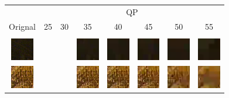 \begin{table}[H]
  \centering
  \begin{tabular}{| c | c | c | c | c | c | c | c |}
    \hline                          & \multicolumn{7}{c|}{QP} \\ \cline{2-8} 
    \multirow{-2}{*}{Orignal} & 25    & 30   & 35   & 40   & 45   & 50   & 55   \\ \hline 
    &&&&&&&\\
    \includegraphics[height=1cm]{figures/11.png}                                                 &      &      & \includegraphics[height=1cm]{figures/12.png}       & \includegraphics[height=1cm]{figures/13.png}       & \includegraphics[height=1cm]{figures/14.png}    & \includegraphics[height=1cm]{figures/15.png}    & \includegraphics[height=1cm]{figures/16.png}    \\ 
    \includegraphics[height=1cm]{figures/21.png}                                                  &       &      &  \includegraphics[height=1cm]{figures/22.png}     &  \includegraphics[height=1cm]{figures/23.png}     &  \includegraphics[height=1cm]{figures/24.png}     &  \includegraphics[height=1cm]{figures/25.png}     &  \includegraphics[height=1cm]{figures/26.png}     \\ 

\end{tabular}
\end{table}
